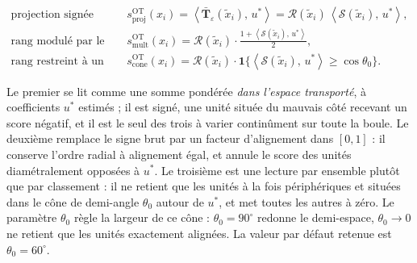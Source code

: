 \documentclass[11pt,a4paper]{article}
\theoremstyle{definition}
\theoremstyle{remark}
\newcommand{\scal}[2]{\left\langle #1 ,\, #2 \right\rangle}
\newcommand{\ind}[1]{\mathbf{1}\{#1\}}
\newcommand{\Tmap}{\mathbf{T}}
\begin{document}
\medskip

\begin{align*}
  \text{projection signée} \qquad
  & s^{\mathrm{OT}}_{\mathrm{proj}}(x_i)
    = \scal{\bar{\Tmap}_\varepsilon(\tilde{x}_i)}{u^{*}}
    = \mathcal{R}(\tilde{x}_i)\,\scal{\mathcal{S}(\tilde{x}_i)}{u^{*}}, \\[0.3em]
  \text{rang modulé par le signe} \qquad
  & s^{\mathrm{OT}}_{\mathrm{mult}}(x_i)
    = \mathcal{R}(\tilde{x}_i)\cdot
      \frac{1 + \scal{\mathcal{S}(\tilde{x}_i)}{u^{*}}}{2}, \\[0.3em]
  \text{rang restreint à un cône} \qquad
  & s^{\mathrm{OT}}_{\mathrm{cone}}(x_i)
    = \mathcal{R}(\tilde{x}_i)\cdot
      \ind{\scal{\mathcal{S}(\tilde{x}_i)}{u^{*}} \ge \cos\theta_0}.
\end{align*}

\bigskip

Le premier se lit comme une somme pondérée \emph{dans l'espace transporté}, à coefficients
$u^{*}$ estimés ; il est signé, une unité située du mauvais côté recevant un score négatif,
et il est le seul des trois à varier continûment sur toute la boule. Le deuxième remplace le
signe brut par un facteur d'alignement dans $[0,1]$ : il conserve l'ordre radial à
alignement égal, et annule le score des unités diamétralement opposées à $u^{*}$. Le
troisième est une lecture par ensemble plutôt que par classement : il ne retient que les
unités à la fois périphériques et situées dans le cône de demi-angle $\theta_0$ autour de
$u^{*}$, et met toutes les autres à zéro. Le paramètre $\theta_0$ règle la largeur de ce
cône : $\theta_0 = 90^\circ$ redonne le demi-espace, $\theta_0 \to 0$ ne retient que les
unités exactement alignées. La valeur par défaut retenue est $\theta_0 = 60^\circ$.

\medskip
\end{document}
